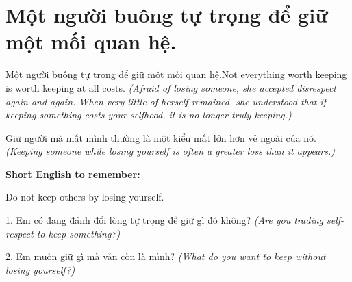 \section{Một người buông tự trọng để giữ một mối quan hệ.}
\begin{truyen}{Một người buông tự trọng để giữ một mối quan hệ.}{Not everything worth keeping is worth keeping at all costs.}
\textit{(Afraid of losing someone, she accepted disrespect again and again. When very little of herself remained, she understood that if keeping something costs your selfhood, it is no longer truly keeping.)}
\end{truyen}
\begin{baihoc}
Giữ người mà mất mình thường là một kiểu mất lớn hơn vẻ ngoài của nó.
\textit{(Keeping someone while losing yourself is often a greater loss than it appears.)}
\end{baihoc}
\begin{ghinhoanh}\textbf{Short English to remember:}

Do not keep others by losing yourself.
\end{ghinhoanh}
\begin{tuhocnhanh}
1. Em có đang đánh đổi lòng tự trọng để giữ gì đó không? \textit{(Are you trading self-respect to keep something?)}

2. Em muốn giữ gì mà vẫn còn là mình? \textit{(What do you want to keep without losing yourself?)}
\end{tuhocnhanh}
\ngancach

